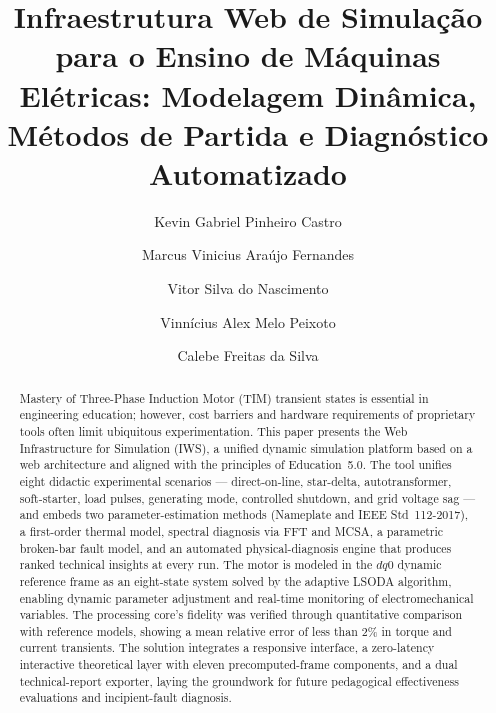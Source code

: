\documentclass[a4paper]{ifacconf}
\begin{document}

\begin{frontmatter}
\vspace*{-2cm}
\title{Infraestrutura Web de Simulação para o Ensino de Máquinas Elétricas: Modelagem Dinâmica, Métodos de Partida e Diagnóstico Automatizado}

\author[First]{Kevin Gabriel Pinheiro Castro}
\author[First]{Marcus Vinicius Araújo Fernandes}
\author[First]{Vitor Silva do Nascimento}
\author[First]{Vinnícius Alex Melo Peixoto}
\author[First]{Calebe Freitas da Silva}

\address[First]{Diretoria de Indústria, Campus Natal-Central, Instituto Federal de Educação, Ciência e Tecnologia do Rio Grande do Norte (IFRN), RN. (e-mail: k.g.pinheiro.castro@gmail.com; marcus.fernandes@ifrn.edu.br; vitrsn@gmail.com; vinicius.alex.melo@hotmail.com; calebe8839@gmail.com)}
\vskip 1mm
\renewcommand{\abstractname}{{\bf Abstract:~}}
\begin{abstract}
Mastery of Three-Phase Induction Motor (TIM) transient states is essential in engineering education; however, cost barriers and hardware requirements of proprietary tools often limit ubiquitous experimentation. This paper presents the Web Infrastructure for Simulation (IWS), a unified dynamic simulation platform based on a web architecture and aligned with the principles of Education~5.0. The tool unifies eight didactic experimental scenarios — direct-on-line, star-delta, autotransformer, soft-starter, load pulses, generating mode, controlled shutdown, and grid voltage sag — and embeds two parameter-estimation methods (Nameplate and IEEE Std~112-2017), a first-order thermal model, spectral diagnosis via FFT and MCSA, a parametric broken-bar fault model, and an automated physical-diagnosis engine that produces ranked technical insights at every run. The motor is modeled in the $dq0$ dynamic reference frame as an eight-state system solved by the adaptive LSODA algorithm, enabling dynamic parameter adjustment and real-time monitoring of electromechanical variables. The processing core's fidelity was verified through quantitative comparison with reference models, showing a mean relative error of less than 2\% in torque and current transients. The solution integrates a responsive interface, a zero-latency interactive theoretical layer with eleven precomputed-frame components, and a dual technical-report exporter, laying the groundwork for future pedagogical effectiveness evaluations and incipient-fault diagnosis.
\vskip 1mm

\end{abstract}
\end{frontmatter}
\end{document}
